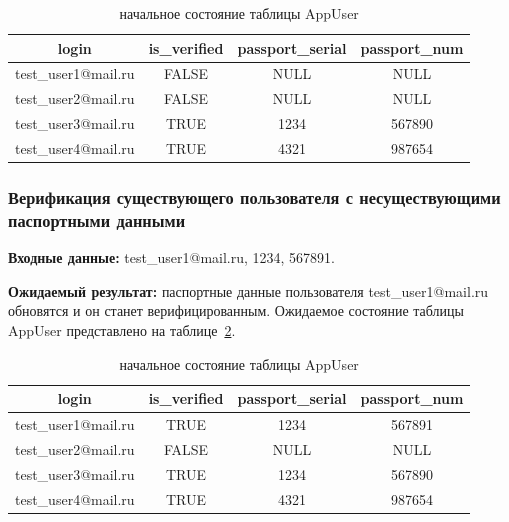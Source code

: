 \begin{table}[H]
	\begin{center}
		\caption{начальное состояние таблицы AppUser}
		\begin{tabular}{|c|c|c|c|}
			\hline
			login & is\_verified & passport\_serial & passport\_num \\
			\hline
			test\_user1@mail.ru & FALSE & NULL & NULL \\
			\hline
			test\_user2@mail.ru & FALSE & NULL & NULL \\
			\hline
            test\_user3@mail.ru & TRUE & 1234 & 567890 \\
			\hline
            test\_user4@mail.ru & TRUE & 4321 & 987654 \\
			\hline
		\end{tabular}
		\label{table:db:user_beg}
	\end{center}
\end{table}

\subsubsection{Верификация существующего пользователя с несуществующими паспортными данными}

\textbf{Входные данные:} test\_user1@mail.ru, 1234, 567891.

\textbf{Ожидаемый результат:} паспортные данные пользователя test\_user1@mail.ru обновятся и он станет верифицированным. Ожидаемое состояние таблицы AppUser представлено на таблице~\ref{table:db:user:test1}.

\begin{table}[H]
	\begin{center}
		\caption{начальное состояние таблицы AppUser}
		\begin{tabular}{|c|c|c|c|}
			\hline
			login & is\_verified & passport\_serial & passport\_num \\
			\hline
			test\_user1@mail.ru & TRUE & 1234 & 567891 \\
			\hline
			test\_user2@mail.ru & FALSE & NULL & NULL \\
			\hline
            test\_user3@mail.ru & TRUE & 1234 & 567890 \\
			\hline
            test\_user4@mail.ru & TRUE & 4321 & 987654 \\
			\hline
		\end{tabular}
		\label{table:db:user:test1}
	\end{center}
\end{table}

